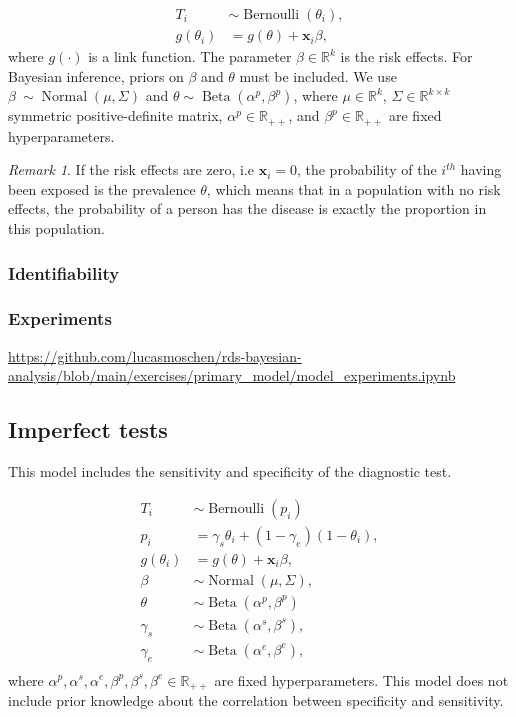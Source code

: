 \documentclass[a4paper, notitlepage, 11pt]{article}
\newcommand{\R}{\mathbb{R}}
\newcommand{\x}{\boldsymbol{x}}
\newcommand{\N}{\operatorname{Normal}}
\newcommand{\betadist}{\operatorname{Beta}}
\theoremstyle{definition}
\theoremstyle{remark}
\newtheorem*{remark}{Remark}
\begin{document}
\begin{equation}
  \begin{aligned}
    T_i &\sim \operatorname{Bernoulli}(\theta_i), \\
    g(\theta_i) &= g(\theta) + \x_i\beta, 
  \end{aligned}  
\end{equation}
where $g(\cdot)$ is a link function.
The parameter $\beta \in \R^{k}$ is the risk effects. For Bayesian inference, priors on
$\beta$ and $\theta$ must be included. We use $\beta ~ \sim \N(\mu, \Sigma)$
and $\theta \sim \betadist(\alpha^{p}, \beta^p)$, where $\mu
\in \R^{k}$, $\Sigma \in \R^{k\times k}$ symmetric positive-definite matrix,
$\alpha^p \in \R_{++}$, and $\beta^p \in \R_{++}$
are fixed hyperparameters. 

\begin{remark}
  If the risk effects are zero, i.e $\x_i = 0$, the probability of the
  $i^{th}$ having been exposed is the prevalence $\theta$, which means that in
  a population with no risk effects, the probability of a person has the
  disease is exactly the proportion in this population. 
\end{remark}

\subsubsection{Identifiability}

\subsubsection{Experiments}

\url{https://github.com/lucasmoschen/rds-bayesian-analysis/blob/main/exercises/primary_model/model_experiments.ipynb}

\subsection{Imperfect tests}

This model includes the sensitivity and specificity of the diagnostic test. 

\begin{equation}
  \begin{aligned}
    T_i &\sim \operatorname{Bernoulli}(p_i) \\
    p_i &= \gamma_s\theta_i + (1-\gamma_e)(1 - \theta_i),  \\
    g(\theta_i) &= g(\theta) + \x_i\beta,  \\
    \beta &\sim \N(\mu, \Sigma), \\ 
    \theta &\sim \betadist(\alpha^p, \beta^p) \\
    \gamma_s &\sim \betadist(\alpha^s, \beta^s), \\
    \gamma_e &\sim \betadist(\alpha^e, \beta^e), \\    
  \end{aligned}  
\end{equation}
where $\alpha^p, \alpha^s, \alpha^e, \beta^p, \beta^s, \beta^e \in \R_{++}$ are fixed hyperparameters.
This model does not include prior knowledge about the correlation between
specificity and sensitivity. 
\end{document}

